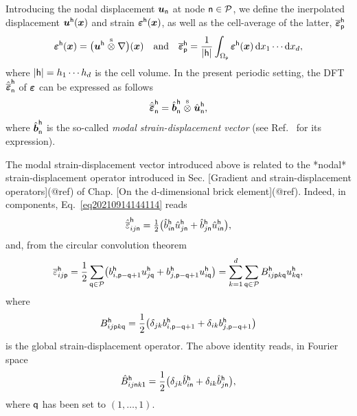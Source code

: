 Introducing the nodal displacement \(\boldsymbol u_\mathsf{n}\) at node
\(\mathsf{n}\in\mathcal{P}\), we define the inerpolated displacement
\(\boldsymbol u^\mathsf{h}(\boldsymbol x)\) and strain \(\boldsymbol{\boldsymbol{\varepsilon}}^\mathsf{h}(\boldsymbol x)\), as
well as the cell-average of the latter,
\(\overline{\boldsymbol{\boldsymbol{\varepsilon}}}_\mathsf{p}^\mathsf{h}\)
\begin{equation}
  \boldsymbol\varepsilon^\mathsf{h}(\boldsymbol x)=\bigl(\boldsymbol
  u^\mathsf{h}\stackrel{\mathrm{s}}{\otimes}\nabla\bigr)(\boldsymbol x)
  \quad\text{and}\quad
  \overline{\boldsymbol\varepsilon}_\mathsf{p}^\mathsf{h}
  =\frac1{\lvert\mathsf{h}\rvert}\int_{\Omega_\mathsf{p}}\boldsymbol{\boldsymbol{\varepsilon}}^\mathsf{h}(\boldsymbol x)
  \,\mathrm d x_1\cdots\mathrm d x_d,
\end{equation}
where \(|\mathsf{h}|=h_1\cdots h_d\) is the cell volume. In the present periodic
setting, the DFT \(\hat{\overline{\boldsymbol\varepsilon}}_\mathsf{n}^\mathsf{h}\) of
\(\boldsymbol\varepsilon\) can be expressed as follows
\begin{equation}
  \label{eq:20210914144114}
  \hat{\overline{\boldsymbol\varepsilon}}_\mathsf{n}^\mathsf{h}
  =\hat{\boldsymbol b}_\mathsf{n}^\mathsf{h}\stackrel{\mathrm{s}}{\otimes}\hat{\boldsymbol u}_\mathsf{n}^\mathsf{h},
\end{equation}
where \(\hat{\boldsymbol b}_\mathsf{n}^\mathsf{h}\) is the so-called \emph{modal
  strain-displacement vector} (see Ref.~\cite{bris2017} for its expression).

The modal strain-displacement vector introduced above is related to the *nodal*
strain-displacement operator introduced in Sec. [Gradient and
strain-displacement operators](@ref) of Chap. [On the d-dimensional brick
element](@ref). Indeed, in components, Eq. \eqref{eq20210914144114} reads
\begin{equation}
  \hat{\overline{\varepsilon}}_{ij\mathsf{n}}^\mathsf{h}
  =\tfrac12\bigl(\hat{b}_{i\mathsf{n}}^\mathsf{h}\hat{u}_{j\mathsf{n}}^\mathsf{h}
  +\hat{b}_{j\mathsf{n}}^\mathsf{h}\hat{u}_{i\mathsf{n}}^\mathsf{h}\bigr),
\end{equation}
and, from the circular convolution theorem
\begin{equation}
  \overline{\varepsilon}_{ij\mathsf{p}}^\mathsf{h}
  =\frac12\sum_{\mathsf{q}\in\mathcal{P}}\bigl(
  b_{i,\mathsf{p}-\mathsf{q}+1}^\mathsf{h}u_{j\mathsf{q}}^\mathsf{h}
  +b_{j,\mathsf{p}-\mathsf{q}+1}^\mathsf{h}u_{i\mathsf{q}}^\mathsf{h}\bigr)
  =\sum_{k=1}^d\sum_{\mathsf{q}\in\mathcal{P}}B_{ij\mathsf{p}k\mathsf{q}}^\mathsf{h}
  u_{k\mathsf{q}}^\mathsf{h},
\end{equation}
where
\begin{equation}
  B_{ij\mathsf{p}k\mathsf{q}}^\mathsf{h}
  =\frac12\bigl(\delta_{jk}b_{i,\mathsf{p}-\mathsf{q}+1}^\mathsf{h}
  +\delta_{ik}b_{j,\mathsf{p}-\mathsf{q}+1}^\mathsf{h}\bigr)
\end{equation}
is the global strain-displacement operator. The above identity reads, in Fourier
space
\begin{equation}
  \hat{B}_{ij\mathsf{n}k\mathsf{1}}^\mathsf{h}
  =\frac12\bigl(\delta_{jk}\hat{b}_{i\mathsf{n}}^\mathsf{h}
  +\delta_{ik}\hat{b}_{j\mathsf{n}}^\mathsf{h}\bigr),
\end{equation}
where \(\mathsf{q}\) has been set to \((1, \ldots, 1)\).

